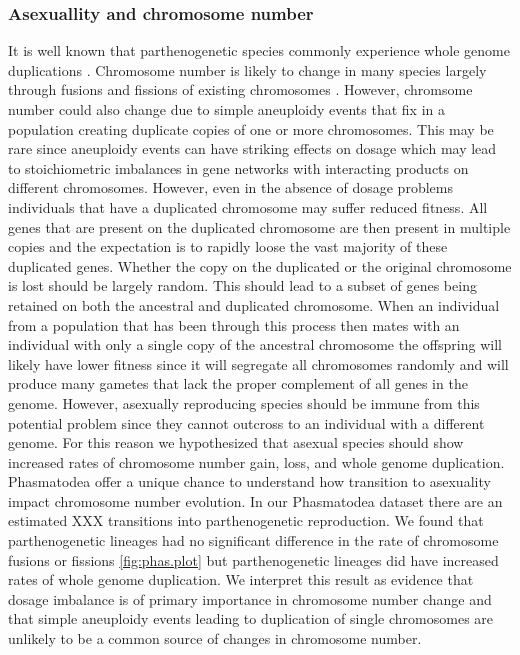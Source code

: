 \subsubsection{Asexuallity and chromosome number}

It is well known that parthenogenetic species commonly experience whole genome duplications \citep{lokki1980polyploidy}.
Chromosome number is likely to change in many species largely through fusions and fissions of existing chromosomes \citep{sved2016}.
However, chromsome number could also change due to simple aneuploidy events that fix in a population creating duplicate copies of one or more chromosomes.
This may be rare since aneuploidy events can have striking effects on dosage which may lead to stoichiometric imbalances in gene networks with interacting products on different chromosomes.
However, even in the absence of dosage problems individuals that have a duplicated chromosome may suffer reduced fitness.
All genes that are present on the duplicated chromosome are then present in multiple copies and the expectation is to rapidly loose the vast majority of these duplicated genes.
Whether the copy on the duplicated or the original chromosome is lost should be largely random.
This should lead to a subset of genes being retained on both the ancestral and duplicated chromosome.
When an individual from a population that has been through this process then mates with an individual with only a single copy of the ancestral chromosome the offspring will likely have lower fitness since it will segregate all chromosomes randomly and will produce many gametes that lack the proper complement of all genes in the genome. 
However, asexually reproducing species should be immune from this potential problem since they cannot outcross to an individual with a different genome. 
For this reason we hypothesized that asexual species should show increased rates of chromosome number gain, loss, and whole genome duplication.
Phasmatodea offer a unique chance to understand how transition to asexuality impact chromosome number evolution.
In our Phasmatodea dataset there are an estimated XXX transitions into parthenogenetic reproduction. 
We found that parthenogenetic lineages had no significant difference in the rate of chromosome fusions or fissions \ref{fig:phas.plot} but parthenogenetic lineages did have increased rates of whole genome duplication.
We interpret this result as evidence that dosage imbalance is of primary importance in chromosome number change and that simple aneuploidy events leading to duplication of single chromosomes are unlikely to be a common source of changes in chromosome number.





